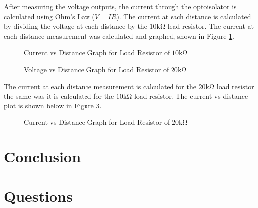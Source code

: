 \documentclass[CMPE]{KGCOEReport}
\begin{document}
After measuring the voltage outputs, the current through the optoisolator is calculated using Ohm's Law ($V = IR$). The current at each distance is calculated by dividing the voltage at each distance by the $10\si{\kilo\ohm}$ load resistor. The current at each distance measurement was calculated and graphed, shown in Figure \ref{10k_current_graph}.
\begin{figure}[H]
	\centering
	\caption{Current vs Distance Graph for Load Resistor of $10\si{\kilo\ohm}$}
	\label{10k_current_graph}
\end{figure}

\begin{figure}[H]
	\centering
	\caption{Voltage vs Distance Graph for Load Resistor of $20\si{\kilo\ohm}$}
	\label{20k_voltage_graph}
\end{figure}

The current at each distance measurement is calculated for the $20\si{\kilo\ohm}$ load resistor the same was it is calculated for the $10\si{\kilo\ohm}$ load resistor. The current vs distance plot is shown below in Figure \ref{20k_current_graph}.
\begin{figure}[H]
	\centering
	\caption{Current vs Distance Graph for Load Resistor of $20\si{\kilo\ohm}$}
	\label{20k_current_graph}
\end{figure}


\section*{Conclusion}

\section*{Questions}
\end{document}
